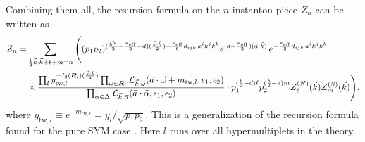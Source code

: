 \documentclass[letterpaper, 11pt]{article}
\newcommand{\nn}{\nonumber}
\def\CL{{\cal L}}
\def\a{\alpha}
\def\e{\epsilon}
\def\k{\kappa}
\def\w{\omega}
\def\D{\Delta}
\begin{document}
Combining them all, the resursion formula on the $n$-instanton piece $Z_n$ can be written as
\begin{align}
  \label{eq:recursion}
  Z_n = &\sum_{\frac{1}{2}\vec{k}\cdot\vec{k} + \ell + m = n}  
  \Bigg( (p_1p_2)^{(\frac{h^\vee}{2} - \frac{\kappa_\text{eff}}{2}-d) (\frac{\vec{k}\cdot\vec{k}}{2}) +\frac{\k_\text{eff}}{6}d_{ijk}\,k^ik^jk^k} e^{(d+\frac{\k_\text{eff}}{2})(\vec{a}\cdot\vec{k})}\,
 e^{-\frac{\k_\text{eff}}{2}d_{ijk}\,a^ik^jk^k} \\& 
 \times    \frac{\prod_{l} y_{\text{tw}, l}^{-I_2(\boldsymbol{R}_l)(\frac{\vec{k}\cdot\vec{k}}{4})} \prod_{\w \in \boldsymbol{R}_l} \CL_{\vec{k}\cdot\vec{\w}}(\vec{a}\cdot \vec{\w} + m_{\text{tw},l}, \e_1,\e_2)}{ \prod_{\a \in \D} \CL_{\vec{k} \cdot \vec{\a}} (\vec{a}\cdot\vec{\alpha}, \epsilon_1, \epsilon_2)}
 \cdot p_1^{(\frac{b}{2}-d)\ell}p_2^{(\frac{b}{2}-d)m}Z^{(N)}_{\ell}(\vec{k})  Z^{(S)}_m (\vec{k}) \Bigg) \nn,
 \end{align}
where $y_{\text{tw},l} \equiv e^{-m_{\text{tw},l}} = y_l / \sqrt{p_1p_2}$. This is a generalization of the recursion formula found for the pure SYM case \cite{Nakajima:2005fg,Gottsche:2006bm}. Here $l$ runs over all hypermultiplets in the theory.  
\end{document}
